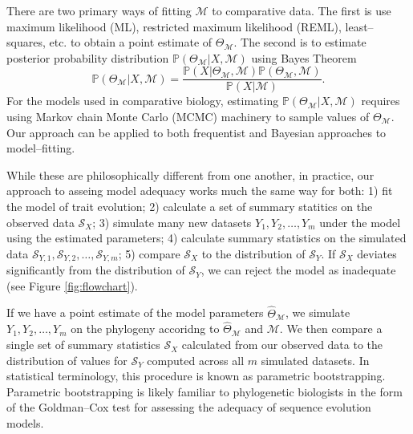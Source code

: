 \documentclass[a4paper,12pt]{article}
\begin{document}
There are two primary ways of fitting $\mathcal{M}$ to comparative data. The first is use maximum likelihood (ML), restricted maximum likelihood (REML), least--squares, etc. to obtain a point estimate of $\Theta_{\mathcal{M}}$. The second is to estimate posterior probability distribution $\mathbb{P}(\Theta_{\mathcal{M}}|X, \mathcal{M})$ using Bayes Theorem
\begin{equation}
\mathbb{P}(\Theta_{\mathcal{M}}|X,\mathcal{M}) = \frac{\mathbb{P}(X|\Theta_{\mathcal{M}}, \mathcal{M})\mathbb{P}(\Theta_\mathcal{M}, \mathcal{M})}{\mathbb{P}(X|\mathcal{M})}.
\end{equation}
For the models used in comparative biology, estimating $\mathbb{P}(\Theta_{\mathcal{M}}|X, \mathcal{M})$ requires using Markov chain Monte Carlo (MCMC) machinery to sample values of $\Theta_{\mathcal{M}}$. Our approach can be applied to both frequentist and Bayesian approaches to model--fitting.  

While these are philosophically different from one another, in practice, our approach to asseing model adequacy works much the same way for both: 1) fit the model of trait evolution; 2) calculate a set of summary statitics on the observed data $\mathcal{S}_X$; 3) simulate many new datasets $Y_1, Y_2, \ldots, Y_m$ under the model using the estimated parameters; 4) calculate summary statistics on the simulated data $\mathcal{S}_{Y,1}, \mathcal{S}_{Y,2}, \ldots, \mathcal{S}_{Y,m}$; 5) compare $\mathcal{S}_X$ to the distribution of $\mathcal{S}_Y$. If $\mathcal{S}_X$ deviates significantly from the distribution of $\mathcal{S}_Y$, we can reject the model as inadequate (see Figure \ref{fig:flowchart}).

If we have a point estimate of the model parameters $\hat{\Theta}_{\mathcal{M}}$, we simulate $Y_1, Y_2, \ldots, Y_m$ on the phylogeny accoridng to $\hat{\Theta}_{\mathcal{M}}$ and $\mathcal{M}$. We then compare a single set of summary statistics $\mathcal{S}_X$ calculated from our observed data to the distribution of values for $\mathcal{S}_Y$ computed across all $m$ simulated datasets. In statistical terminology, this procedure is known as parametric bootstrapping. Parametric bootstrapping is likely familiar to phylogenetic biologists in the form of the Goldman--Cox test \citep{Goldman} for assessing the adequacy of sequence evolution models.
\end{document}

